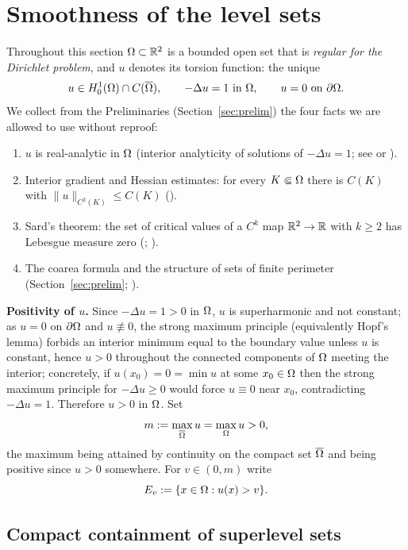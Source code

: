 \section{Smoothness of the level sets}\label{sec:smooth}

Throughout this section $\Omega\subset\mathbb{R}^2$ is a bounded open set that is
\emph{regular for the Dirichlet problem}, and $u$ denotes its torsion
function: the unique
\[
  u\in H^1_0(\Omega)\cap C(\overline{\Omega}),\qquad -\Delta u=1\ \text{in }\Omega,
  \qquad u=0\ \text{on }\partial\Omega .
\]
We collect from the Preliminaries (Section~\ref{sec:prelim}) the four facts
we are allowed to use without reproof:
\begin{enumerate}
\item[(P1)] $u$ is real-analytic in $\Omega$ (interior analyticity of solutions
  of $-\Delta u=1$; see \cite[Ch.~6, \S6.1 and the analyticity
  theorem]{Morrey1966} or \cite[Theorem~6.6.1]{Morrey1966}).
\item[(P2)] Interior gradient and Hessian estimates: for every $K\Subset\Omega$
  there is $C(K)$ with $\|u\|_{C^2(K)}\le C(K)$
  (\cite[Theorems~6.2, 6.17 and Corollary~6.3]{GT1983}).
\item[(P3)] Sard's theorem: the set of critical values of a $C^k$ map
  $\mathbb{R}^2\to\mathbb{R}$ with $k\ge2$ has Lebesgue measure zero
  (\cite[\S2--3]{Milnor1997}; \cite{Sard1942}).
\item[(P4)] The coarea formula and the structure of sets of finite perimeter
  (Section~\ref{sec:prelim}; \cite[\S3.4, \S5]{EvansGariepy2015}).
\end{enumerate}

\medskip
\noindent\textbf{Positivity of $u$.}
Since $-\Delta u=1>0$ in $\Omega$, $u$ is superharmonic and not constant; as
$u=0$ on $\partial\Omega$ and $u\not\equiv0$, the strong maximum principle
(equivalently Hopf's lemma) forbids an interior minimum equal to the boundary
value unless $u$ is constant, hence $u>0$ throughout the connected
components of $\Omega$ meeting the interior; concretely, if $u(x_0)=0=\min u$ at
some $x_0\in\Omega$ then the strong maximum principle for $-\Delta u\ge0$ would
force $u\equiv0$ near $x_0$, contradicting $-\Delta u=1$. Therefore $u>0$ in
$\Omega$. Set
\[
  m:=\max_{\overline{\Omega}}u=\max_{\Omega}u>0 ,
\]
the maximum being attained by continuity on the compact set $\overline{\Omega}$
and being positive since $u>0$ somewhere. For $v\in(0,m)$ write
\[
  E_v:=\{x\in\Omega:u(x)>v\} .
\]

\subsection*{Compact containment of superlevel sets}

